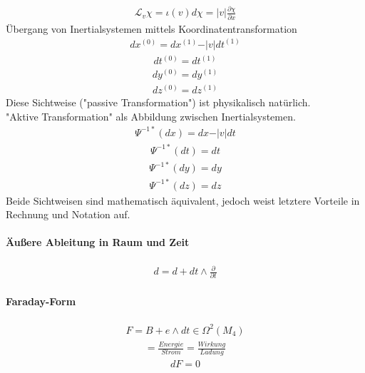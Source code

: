 \documentclass[10pt,a4paper]{article}
\begin{document}
\begin{align}
\mathcal{L}_v \chi = \iota (v) d \chi = \vert v \vert \frac{\partial \chi}{\partial x}
\end{align}
Übergang von Inertialsystemen mittels Koordinatentransformation
\begin{align}
dx^{(0)}=dx^{(1)}-\vert v \vert dt^{(1)}
\end{align}
\begin{align}
dt^{(0)}= dt^{(1)}
\end{align}
\begin{align}
dy^{(0)}= dy^{(1)}
\end{align}
\begin{align}
dz^{(0)}= dz^{(1)}
\end{align}
Diese Sichtweise ("passive Transformation") ist physikalisch natürlich.\\
"Aktive Transformation" als Abbildung zwischen Inertialsystemen.
\begin{align}
\Psi^{-1*} (dx) =dx- \vert v \vert dt
\end{align}
\begin{align}
\Psi^{-1*}(dt)=dt
\end{align}
\begin{align}
\Psi^{-1*}(dy)=dy
\end{align}
\begin{align}
\Psi^{-1*}(dz)=dz
\end{align}
Beide Sichtweisen sind mathematisch äquivalent, jedoch weist letztere Vorteile in Rechnung und Notation auf.
\paragraph{Äußere Ableitung in Raum und Zeit} $\,$ \\
\begin{align}
d= d+ dt \wedge \frac{\partial}{\partial t}
\end{align}
\paragraph{Faraday-Form} $\, $ \\
\begin{align}
F= B+ e \wedge dt \in \Omega ^2 (M_4)
\end{align}
\begin{align}
[F]=\frac{Energie}{Strom} = \frac{Wirkung}{Ladung}
\end{align}
\begin{align}
dF=0
\end{align}
\end{document}
